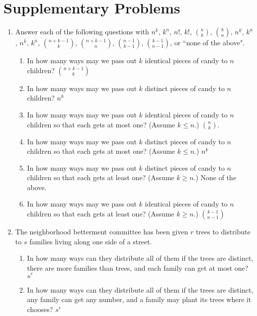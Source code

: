 \documentclass[10pt,]{book}
\theoremstyle{plain}
\theoremstyle{definition}
\numberwithin{equation}{chapter}
\begin{document}
\section[{Supplementary Problems}]{Supplementary Problems}\label{section-12}
\leavevmode%
\begin{enumerate}
\item\hypertarget{li-49}{}Answer each of the following questions with \(n^k\), \(k^n\), \(n!\), \(k!\), \(\binom{n}{k}\), \(\binom{k}{n}\), \(n^{\underline{k}}\), \(k^{\underline{n}}\), \(n^{\overline{k}}\), \(k^{\overline{n}}\), \(\binom{n+k-1}{k}\), \(\binom{n+k-1}{n}\), \(\binom{n-1}{k-1}\), \(\binom{k-1}{n-1}\), or ``none of the above". %
\begin{enumerate}
\item\hypertarget{li-50}{}In how many ways may we pass out \(k\) identical pieces of candy to \(n\) children? \(\binom{n+k-1}{k}\)%
%
\item\hypertarget{li-51}{}In how many ways may we pass out \(k\) distinct pieces of candy to \(n\) children? \(n^k\)%
%
\item\hypertarget{li-52}{}In how many ways may we pass out \(k\) identical pieces of candy to \(n\) children so that each gets at most one?  (Assume \(k\le n\).) \(\binom{n}{k}\).%
%
\item\hypertarget{li-53}{}In how many ways may we pass out \(k\) distinct pieces of candy to \(n\) children so that each gets at most one?  (Assume \(k\le n\).) \(n^{\underline{k}}\)%
%
\item\hypertarget{li-54}{}In how many ways may we pass out \(k\) distinct pieces of candy to \(n\) children so that each gets at least one?  (Assume \(k\ge n\).) None of the above.%
%
\item\hypertarget{li-55}{}In how many ways may we pass out \(k\) identical pieces of candy to \(n\) children so that each gets at least one?  (Assume \(k\ge n\).) \(\binom{k-1}{n-1}\)%
%
\end{enumerate}
%
\item\hypertarget{li-56}{}The neighborhood betterment committee has been given \(r\) trees to distribute to \(s\) families living along one side of a street. %
\begin{enumerate}
\item\hypertarget{li-57}{}In how many ways can they distribute all of them if the trees are distinct, there are more families than trees, and each family can get at most one? \(s^{\underline{r}}\)%
%
\item\hypertarget{li-58}{}In how many ways can they distribute all of them if the trees are distinct, any family can get any number, and a family may plant its trees where it chooses? \(s^r\)%

\end{enumerate}
\end{enumerate}
\end{document}
